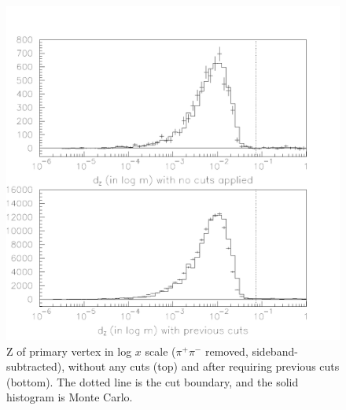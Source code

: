 \begin{figure}[p]
  \includegraphics[width=\linewidth]{plots/cascades_logwz}
  \caption{\label{cascades_logwz} Z of primary vertex in log $x$ scale
  ($\pi^+\pi^-$ removed, sideband-subtracted), without any cuts (top)
  and after requiring previous cuts (bottom).  The dotted line is the
  cut boundary, and the solid histogram is Monte Carlo.}
\end{figure}

